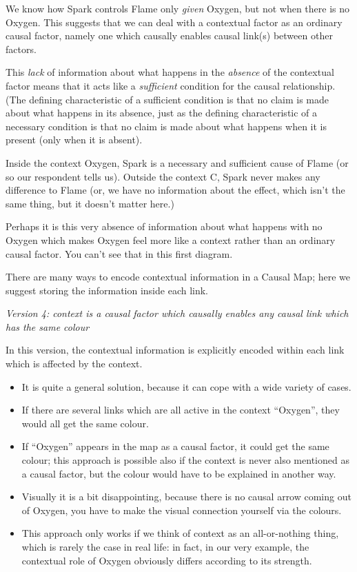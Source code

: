 \documentclass[
]{book}
\begin{document}
We know how Spark controls Flame only \emph{given} Oxygen, but not when there is no Oxygen. This suggests that we can deal with a contextual factor as an ordinary causal factor, namely one which causally enables causal link(s) between other factors.

This \emph{lack} of information about what happens in the \emph{absence} of the contextual factor means that it acts like a \emph{sufficient} condition for the causal relationship. (The defining characteristic of a sufficient condition is that no claim is made about what happens in its absence, just as the defining characteristic of a necessary condition is that no claim is made about what happens when it is present (only when it is absent).

Inside the context Oxygen, Spark is a necessary and sufficient cause of Flame (or so our respondent tells us). Outside the context C, Spark never makes any difference to Flame (or, we have no information about the effect, which isn't the same thing, but it doesn't matter here.)

Perhaps it is this very absence of information about what happens with no Oxygen which makes Oxygen feel more like a context rather than an ordinary causal factor. You can't see that in this first diagram.

There are many ways to encode contextual information in a Causal Map; here we suggest storing the information inside each link.

\emph{Version 4: context is a causal factor which causally enables any causal link which has the same colour}

In this version, the contextual information is explicitly encoded within each link which is affected by the context.

\begin{itemize}
\item
  It is quite a general solution, because it can cope with a wide variety of cases.
\item
  If there are several links which are all active in the context ``Oxygen'', they would all get the same colour.
\item
  If ``Oxygen'' appears in the map as a causal factor, it could get the same colour; this approach is possible also if the context is never also mentioned as a causal factor, but the colour would have to be explained in another way.
\item
  Visually it is a bit disappointing, because there is no causal arrow coming out of Oxygen, you have to make the visual connection yourself via the colours.
\item
  This approach only works if we think of context as an all-or-nothing thing, which is rarely the case in real life: in fact, in our very example, the contextual role of Oxygen obviously differs according to its strength.
\end{itemize}
\end{document}
